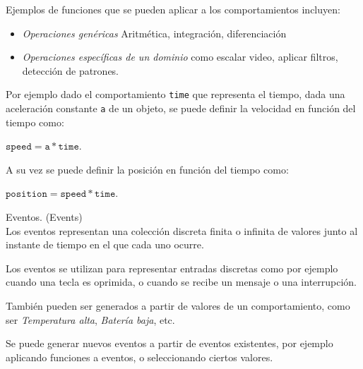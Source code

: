   Ejemplos de funciones que se pueden aplicar a los
comportamientos incluyen:

\begin{itemize}
\item \textit{Operaciones genéricas} Aritmética, integración, diferenciación
\item {
    \textit{Operaciones específicas de un dominio} como escalar video,
    aplicar filtros, detección de patrones.
}
\end{itemize}

  Por ejemplo dado el comportamiento \texttt{time} que representa el tiempo,
dada una aceleración constante \texttt{a} de un objeto, se puede definir la
velocidad en función del tiempo como:
    \begin{center}
    $\texttt{speed} = \texttt{a} * \texttt{time}$.
    \end{center}
  
  A su vez se puede definir la posición en función del tiempo como:
  \begin{center}    
  $\texttt{position} = \texttt{speed} * \texttt{time}$.
  \end{center}

\begin{definicion}
  Eventos. (Events)\cite{petersonhudakelliot99:lambdainmotion} \\

  Los eventos representan una colección discreta finita o infinita de valores
  junto al instante de tiempo en el que cada uno ocurre.


\end{definicion}

  Los eventos se utilizan para representar entradas discretas como por
ejemplo cuando una tecla es oprimida, o cuando se recibe un
mensaje o una interrupción.

  También pueden ser generados a partir de valores de un comportamiento,
como ser \emph{Temperatura alta}, \emph{Batería baja}, etc.

  Se puede generar nuevos eventos a partir de eventos existentes, por
ejemplo aplicando funciones a eventos, o seleccionando ciertos valores.




